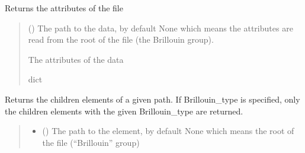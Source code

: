 \documentclass[letterpaper,10pt,english]{sphinxmanual}
\begin{document}
\begin{fulllineitems}

\begin{fulllineitems}
\label{\detokenize{source/HDF5_BLS:HDF5_BLS.wrapper.Wrapper.get_attributes}}
\pysigstartsignatures
\pysiglinewithargsret
{}
{}
{}
\pysigstopsignatures
\sphinxAtStartPar
Returns the attributes of the file
\begin{quote}\begin{description}
\sphinxAtStartPar
{} (\sphinxstyleliteralemphasis{\sphinxupquote{, }}) \textendash{} The path to the data, by default None which means the attributes are read from the root of the file (the Brillouin group).

\sphinxAtStartPar
{} \textendash{} The attributes of the data

\sphinxAtStartPar
dict

\end{description}\end{quote}

\end{fulllineitems}


\begin{fulllineitems}
\label{\detokenize{source/HDF5_BLS:HDF5_BLS.wrapper.Wrapper.get_children_elements}}
\pysigstartsignatures
\pysiglinewithargsret
{}
{\sphinxparamcomma {}}
{}
\pysigstopsignatures
\sphinxAtStartPar
Returns the children elements of a given path. If Brillouin\_type is specified, only the children elements with the given Brillouin\_type are returned.
\begin{quote}\begin{description}
\begin{itemize}
\item {} 
\sphinxAtStartPar
{} (\sphinxstyleliteralemphasis{\sphinxupquote{, }}) \textendash{} The path to the element, by default None which means the root of the file (“Brillouin” group)


\end{itemize}
\end{description}
\end{quote}
\end{fulllineitems}
\end{fulllineitems}
\end{document}
